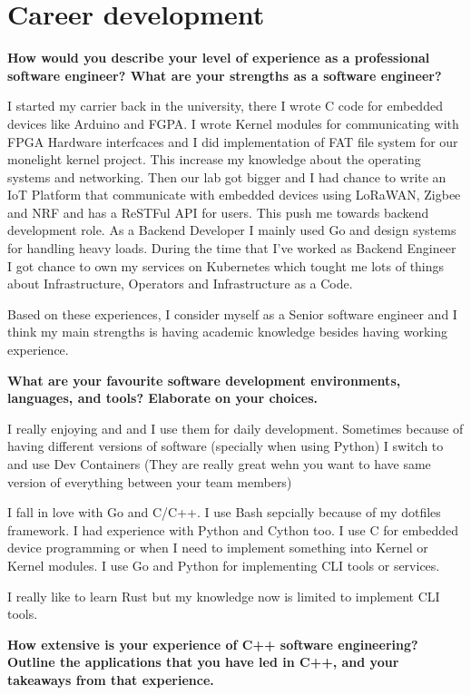 \section{Career development}

\textbf{How would you describe your level of experience as a professional software engineer?
What are your strengths as a software engineer?}

I started my carrier back in the university, there I wrote C code for embedded devices like Arduino and FGPA.
I wrote Kernel modules for communicating with FPGA Hardware interfcaces and I did implementation of FAT file system
for our monelight kernel project.
This increase my knowledge about the operating systems and networking. Then our lab got bigger and I had chance
to write an IoT Platform that communicate with embedded devices using LoRaWAN, Zigbee and NRF and has a ReSTFul
API for users. This push me towards backend development role. As a Backend Developer I mainly used Go and design
systems for handling heavy loads. During the time that I've worked as Backend Engineer I got chance to own my services
on Kubernetes which tought me lots of things about Infrastructure, Operators and Infrastructure as a Code.

Based on these experiences, I consider myself as a Senior software engineer and I think my main strengths is having
academic knowledge besides having working experience.

\textbf{What are your favourite software development environments, languages, and tools? Elaborate on your choices.}

I really enjoying \href{Neovim}{} and \href{vim}{} and I use them for daily development. Sometimes because
of having different versions of software (specially when using Python) I switch to \href{VSCode}{} and use
Dev Containers (They are really great wehn you want to have same version of everything between your team members)

I fall in love with Go and C/C++. I use Bash sepcially because of my dotfiles framework. I had experience with
Python and Cython too. I use C for embedded device programming or when I need to implement something into
Kernel or Kernel modules. I use Go and Python for implementing CLI tools or services.

I really like to learn Rust but my knowledge now is limited to implement CLI tools.

\textbf{How extensive is your experience of C++ software engineering? Outline the applications that you have led in C++,
and your takeaways from that experience.}

